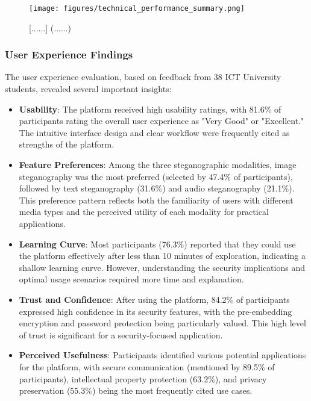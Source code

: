 \documentclass[12pt, a4paper, oneside]{book}
\begin{document}
\begin{figure}[htbp]
    \centering
    \texttt{[image: figures/technical\_performance\_summary.png]}
    \caption{[......] (......)}
    \label{fig:technical_performance}
\end{figure}

\subsubsection{User Experience Findings}

The user experience evaluation, based on feedback from 38 ICT University students, revealed several important insights:

\begin{itemize}[leftmargin=*]
    \item \textbf{Usability}: The platform received high usability ratings, with 81.6\% of participants rating the overall user experience as "Very Good" or "Excellent." The intuitive interface design and clear workflow were frequently cited as strengths of the platform.

    \item \textbf{Feature Preferences}: Among the three steganographic modalities, image steganography was the most preferred (selected by 47.4\% of participants), followed by text steganography (31.6\%) and audio steganography (21.1\%). This preference pattern reflects both the familiarity of users with different media types and the perceived utility of each modality for practical applications.

    \item \textbf{Learning Curve}: Most participants (76.3\%) reported that they could use the platform effectively after less than 10 minutes of exploration, indicating a shallow learning curve. However, understanding the security implications and optimal usage scenarios required more time and explanation.

    \item \textbf{Trust and Confidence}: After using the platform, 84.2\% of participants expressed high confidence in its security features, with the pre-embedding encryption and password protection being particularly valued. This high level of trust is significant for a security-focused application.

    \item \textbf{Perceived Usefulness}: Participants identified various potential applications for the platform, with secure communication (mentioned by 89.5\% of participants), intellectual property protection (63.2\%), and privacy preservation (55.3\%) being the most frequently cited use cases.
\end{itemize}
\end{document}
